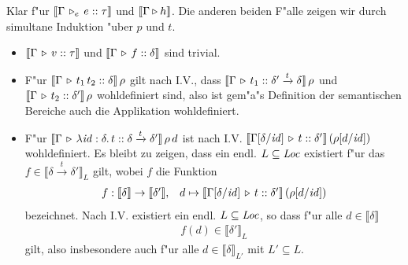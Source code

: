 \documentclass[12pt,a4paper,bigheadings]{scrartcl}
\newcommand{\semantic}[1]{\ensuremath{\llbracket#1\rrbracket}}
\newcommand{\tto}{\ensuremath{\xrightarrow{t}}}
\newcommand{\Tje}[3]{#1 \,\tr_e\, #2\cc#3}
\begin{document}
\begin{beweis}
  Klar f"ur $\semantic{\Tje{\Gamma}{e}{\tau}}$ und $\semantic{\Tjh{\Gamma}{h}}$. Die anderen beiden
  F"alle zeigen wir durch simultane Induktion "uber $p$ und $t$.
  \begin{itemize}
    \item $\semantic{\Tj{\Gamma}{v}{\tau}}$ und $\semantic{\Tj{\Gamma}{f}{\delta}}$ sind trivial.

    \item F"ur $\semantic{\Tj{\Gamma}{\app{t_1}{t_2}}{\delta}}\,\rho$ gilt nach I.V., dass
          $\semantic{\Tj{\Gamma}{t_1}{\delta'\tto\delta}}\,\rho$ und
          $\semantic{\Tj{\Gamma}{t_2}{\delta'}}\,\rho$ wohldefiniert sind, also ist gem"a"s
          Definition der semantischen Bereiche auch die Applikation wohldefiniert.

    \item F"ur $\semantic{\Tj{\Gamma}{\abstr{\id:\delta}{t}}{\delta\tto\delta'}}\,\rho\,d$ ist nach I.V.
          $\semantic{\Tj{\Gamma[\delta/\id]}{t}{\delta'}}\,(\rho[d/\id])$ wohldefiniert. Es bleibt zu
          zeigen, dass ein endl. $L\subseteq{\text{\it Loc\/}}$ existiert f"ur das $f\in\semantic{\delta\tto\delta'}_L$ gilt,
          wobei $f$ die Funktion
          \[\begin{array}{rl}
            f: \semantic{\delta} \to \semantic{\delta'}, & d \mapsto
            \semantic{\Tj{\Gamma[\delta/\id]}{t}{\delta'}}\,(\rho[d/\id])
          \end{array}\]
          bezeichnet. Nach I.V. existiert ein endl. $L\subseteq{\text{\it Loc\/}}$, so dass f"ur alle $d\in\semantic{\delta}$
          \[\begin{array}{c}
            f(d) \in \semantic{\delta'}_L
          \end{array}\]
          gilt, also insbesondere auch f"ur alle $d\in\semantic{\delta}_{L'}$ mit $L'\subseteq L$.


\end{itemize}
\end{beweis}
\end{document}
